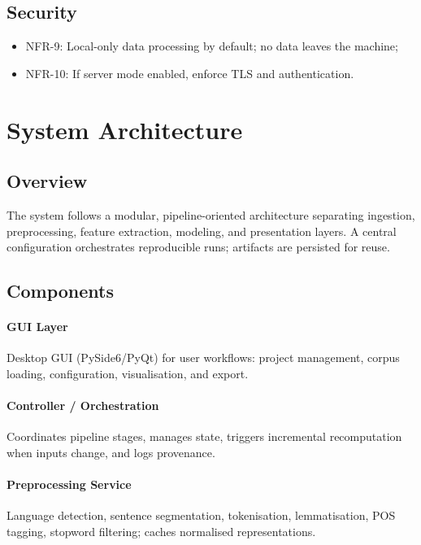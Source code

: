 \subsection{Security}
\begin{itemize}
    \item NFR-9: Local-only data processing by default; no data leaves the machine;
    \item NFR-10: If server mode enabled, enforce TLS and authentication.
\end{itemize}

\section{System Architecture}
\subsection{Overview}
The system follows a modular, pipeline-oriented architecture separating ingestion, preprocessing, feature extraction, modeling, and presentation layers. A central configuration orchestrates reproducible runs; artifacts are persisted for reuse.

% 
% 
% 

\subsection{Components}
\paragraph{GUI Layer}
Desktop GUI (PySide6/PyQt) for user workflows: project management, corpus loading, configuration, visualisation, and export.

\paragraph{Controller / Orchestration}
Coordinates pipeline stages, manages state, triggers incremental recomputation when inputs change, and logs provenance.

\paragraph{Preprocessing Service}
Language detection, sentence segmentation, tokenisation, lemmatisation, POS tagging, stopword filtering; caches normalised representations.


